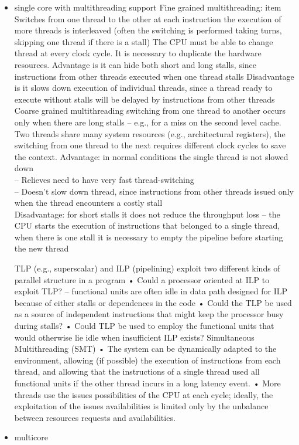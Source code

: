 \begin{itemize}
    \item single core with multithreading support
        \subitem Fine grained multithreading:
            \subsubitem item Switches from one thread to the other at each instruction
            \subsubitem the execution of more threads is interleaved (often the switching is performed taking turns,
            skipping one thread if there is a stall)
            \subsubitem The CPU must be able to change thread at every clock cycle.
            It is necessary to duplicate the hardware resources.
        \textrightarrow Advantage is it can hide both short and long stalls, since instructions from other threads executed
    when one thread stalls
        \textrightarrow Disadvantage is it slows down execution of individual threads, since a thread ready to execute
    without stalls will be delayed by instructions from other threads
        \subitem Coarse grained multithreading
            \subsubitem switching from one thread to another occurs only when there are long stalls – e.g., for a miss on
    the second level cache.
            \subsubitem Two threads share many system resources (e.g., architectural registers), the switching from one thread
    to the next requires different clock cycles to save the context.
        \textrightarrow Advantage: in normal conditions the single thread is not slowed down\\
    – Relieves need to have very fast thread-switching\\
    – Doesn’t slow down thread, since instructions from other threads issued only when the thread encounters a costly
    stall\\
        \textrightarrow Disadvantage: for short stalls it does not reduce the throughput loss – the CPU starts the
    execution of instructions that belonged to a single thread, when there is one stall it is necessary to empty the
    pipeline before starting the new thread

        TLP (e.g., superscalar) and ILP (pipelining) exploit two different kinds of parallel structure in a program
        • Could a processor oriented at ILP to exploit TLP?
        – functional units are often idle in data path designed for ILP because of either stalls or dependences in the code
        • Could the TLP be used as a source of independent instructions that might keep the processor busy during stalls?
        • Could TLP be used to employ the functional units that would otherwise lie idle when insufficient ILP exists?
        \subitem Simultaneous Multithreading (SMT)
        • The system can be dynamically adapted to the environment, allowing (if possible) the execution of instructions
        from each thread, and allowing that the instructions of a single thread used all functional units if the other
        thread incurs in a long latency event.
        • More threads use the issues possibilities of the CPU at each cycle;
        ideally, the exploitation of the issues availabilities is limited only by the unbalance between resources
        requests and availabilities.

    \item multicore
\end{itemize}

